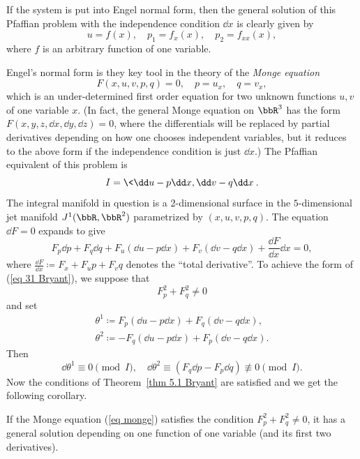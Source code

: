 If the system is put into Engel normal form, then the general solution of this Pfaffian problem with the independence condition $\dd x$ is clearly given by 
\[u=f(x),\quad p_1=f_x(x),\quad p_2=f_{xx}(x),\]
where $f$ is an arbitrary function of one variable.

Engel's normal form is they key tool in the theory of the \emph{Monge equation}
\[F(x,u,v,p,q)=0,\quad p=u_x,\quad q=v_x,\label{eq monge}\]
which is an under-determined first order equation for two unknown functions $u,v$ of one variable $x$. (In fact, the general Monge equation on $\bbR^3$ has the form $F(x,y,z,\dd x,\dd y,\dd z)=0$, where the differentials will be replaced by partial derivatives depending on how one chooses independent variables, but it reduces to the above form if the independence condition is just $\dd x$.) The Pfaffian equivalent of this problem is 
\[I=\<\dd u-p \dd x,\dd v-q\dd x\>.\]
The integral manifold in question is a 2-dimensional surface in the $5$-dimensional jet manifold $J^1(\bbR,\bbR^2)$ parametrized by $(x,u,v,p,q)$. The equation $\dd F=0$ expands to give 
\[F_{p}\dd p+F_q \dd q+F_u(\dd u-p\dd x)+F_v(\dd v-q\dd x)+\frac{\dd F}{\dd x}\dd x=0,\]
where $\frac{\dd F}{\dd x}\coloneqq F_x+F_u p+F_v q$ denotes the ``total derivative''. To achieve the form of (\ref{eq 31 Bryant}), we suppose that 
\[F^2_p +F^2_q\neq 0\]
and set 
\begin{align}
    \theta^1\coloneqq F_p(\dd u-p\dd x)+F_q(\dd v-q \dd x),\\
    \theta^2\coloneqq -F_q(\dd u-p\dd x)+F_p(\dd v-q\dd x).
\end{align}
Then 
\[\dd \theta^1\equiv 0 \pmod{I},\quad \dd\theta^2\equiv (F_q \dd p-F_p \dd q)\not\equiv 0\pmod{I}.\]
Now the conditions of Theorem~\ref{thm 5.1 Bryant} are satisfied and we get the following corollary.

\begin{cor}
    If the Monge equation (\ref{eq monge}) satisfies the condition $F_p^2+F_q^2\neq 0$, it has a general solution depending on one function of one variable (and its first two derivatives).
\end{cor}

